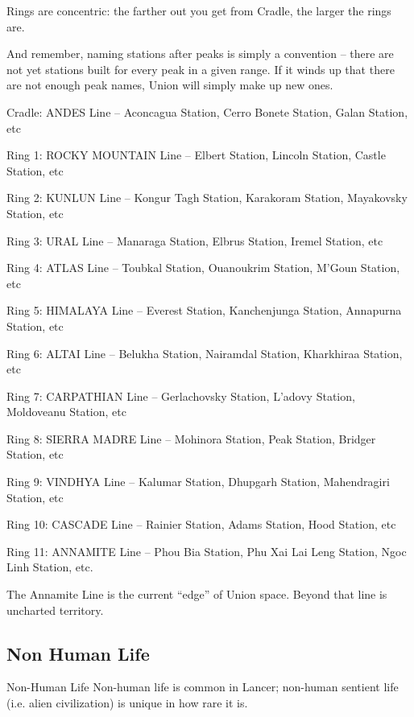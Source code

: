 Rings are concentric: the farther out you get from Cradle, the larger the rings are.   

And remember, naming stations after peaks is simply a convention -- there are not yet stations  
built for every peak in a given range. If it winds up that there are not enough peak names, Union  
will simply make up new ones. 
 

Cradle: ANDES  Line -- Aconcagua Station, Cerro Bonete Station, Galan Station, etc
 

Ring 1: ROCKY MOUNTAIN Line -- Elbert Station, Lincoln Station, Castle Station, etc
 

Ring 2: KUNLUN Line -- Kongur Tagh Station, Karakoram Station, Mayakovsky Station, etc 
 

Ring 3: URAL Line -- Manaraga Station, Elbrus Station, Iremel Station, etc
 

Ring 4: ATLAS  Line -- Toubkal Station, Ouanoukrim Station, M’Goun Station, etc
 

Ring 5: HIMALAYA Line -- Everest Station, Kanchenjunga Station, Annapurna Station, etc
 

Ring 6: ALTAI  Line -- Belukha Station, Nairamdal Station, Kharkhiraa Station, etc 
 

                                                                                                           


Ring 7: CARPATHIAN Line -- Gerlachovsky Station, L’adovy Station, Moldoveanu Station, etc
 

Ring 8: SIERRA MADRE Line -- Mohinora Station, Peak Station, Bridger Station, etc
 

Ring 9: VINDHYA Line -- Kalumar Station, Dhupgarh Station, Mahendragiri Station, etc
 

Ring 10: CASCADE Line -- Rainier Station, Adams Station, Hood Station, etc
 

Ring 11: ANNAMITE  Line -- Phou Bia Station, Phu Xai Lai Leng Station, Ngoc Linh Station, etc. 
 

The Annamite Line is the current “edge” of Union space. Beyond that line is uncharted territory.  
 
\subsection{Non Human Life}
Non-Human Life  
Non-human life is common in Lancer; non-human sentient life (i.e. alien civilization) is unique in  
how rare it is. 
 

